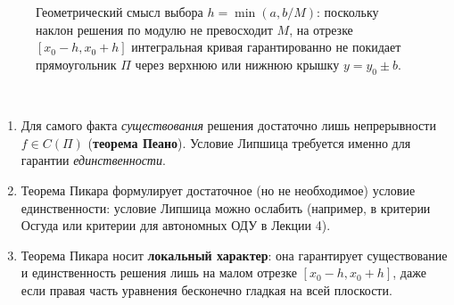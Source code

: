 \begin{figure}[H]
    \caption{Геометрический смысл выбора $h = \min(a, b/M)$: поскольку наклон
    решения по модулю не превосходит $M$, на отрезке $[x_0 - h, x_0 + h]$
    интегральная кривая гарантированно не покидает прямоугольник $\Pi$ через
    верхнюю или нижнюю крышку $y = y_0 \pm b$.}
\end{figure}

\begin{remark} ~
    \begin{enumerate}
        \item Для самого факта \textit{существования} решения достаточно лишь
        непрерывности $f \in C(\Pi)$ (\textbf{теорема Пеано}). Условие Липшица
        требуется именно для гарантии \textit{единственности}.
        \item Теорема Пикара формулирует достаточное (но не необходимое)
        условие единственности: условие Липшица можно ослабить (например, в
        критерии Осгуда или критерии для автономных ОДУ в Лекции 4).
        \item Теорема Пикара носит \textbf{локальный характер}: она
        гарантирует существование и единственность решения лишь на малом
        отрезке $[x_0 - h, x_0 + h]$, даже если правая часть уравнения
        бесконечно гладкая на всей плоскости.
    \end{enumerate}
\end{remark}

